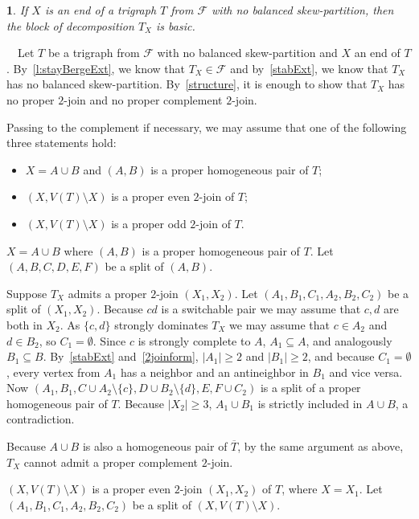 \documentclass[11 pt] {article}
\newtheorem{theorem}{}[section]
\newcounter{claim}
\newcommand{\Proof}{\setcounter{claim}{0}\noindent{\bf Proof.}\ \ }
\begin{document}
\begin{theorem} 
 \label{l:extreme}
 If $X$ is an end of a trigraph $T$ from $\mathcal{F}$ with no balanced
 skew-partition, then the block of decomposition $T_X$ is basic.
\end{theorem}

\Proof Let $T$ be a trigraph from $\mathcal{F}$ with no balanced
skew-partition and $X$ an end of $T$. By~\ref{l:stayBergeExt}, we know
that $T_X\in \mathcal{F}$ and by~\ref{stabExt}, we know that $T_X$ has no
balanced skew-partition. By~\ref{structure}, it is enough to show that
$T_X$ has no proper $2$-join and no proper complement $2$-join.

Passing to the complement if necessary, we may assume that one of the
following three statements hold:
\begin{itemize}
\item $X=A\cup B$ and $(A,B)$ is a proper homogeneous pair of $T$;
\item $(X,V(T)\setminus X)$ is a proper even $2$-join of $T$;
\item $(X,V(T)\setminus X)$ is a proper odd $2$-join of $T$.
\end{itemize}

 $X = A\cup B$ where $(A,B)$ is a proper
homogeneous pair of $T$. Let $(A,B,C,D,E,F)$ be a split of $(A,B)$. 


Suppose $T_X$ admits a proper $2$-join $(X_1,X_2)$. Let
$(A_1,B_1,C_1,A_2,B_2,C_2)$ be a split of $(X_1,X_2)$. Because $cd$
is a switchable pair we may assume that $c,d$ are both in $X_2$. As
$\{c,d\}$ strongly dominates $T_X$ we may assume that $c\in A_2$ and
$d\in B_2$, so $C_1=\emptyset$. Since $c$ is strongly complete
to $A$, $A_1\subseteq A$, and analogously $B_1\subseteq B$.
By~\ref{stabExt} and~\ref{2joinform}, $|A_1|\geq 2$ and $|B_1|\geq 2$, and because
$C_1=\emptyset$, every vertex from $A_1$ has a neighbor and an
antineighbor in $B_1$ and vice versa. Now $(A_1, B_1, C\cup
A_2\setminus \{c\}, D \cup B_2 \setminus \{d\}, E, F\cup C_2)$ is
a split of a proper homogeneous pair of $T$. Because $|X_2|\geq 3$,
$A_1\cup B_1$ is strictly included in $A\cup B$, a contradiction.

Because $A\cup B$ is also a homogeneous pair of $\overline{T}$, by the
same argument as above, $T_X$ cannot admit a proper complement $2$-join.


 $(X,V(T)\setminus X)$ is a proper even $2$-join
$(X_1, X_2)$ of $T$, where $X=X_1$. Let $(A_1,B_1,C_1,A_2,B_2,C_2)$ be a split of
$(X,V(T)\setminus X)$.
\end{document}
